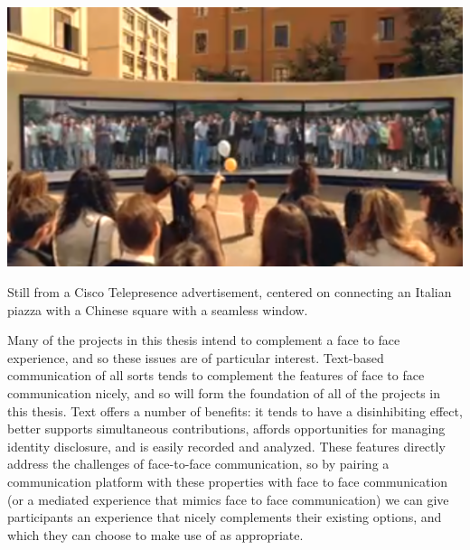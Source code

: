 \begin{marginfigure}
	\includegraphics{figures/cisco-telepresence.png}
	\caption{Still from a Cisco Telepresence advertisement, centered on connecting an Italian piazza with a Chinese square with a seamless window.}
	\label{fig:cisco-telepresence}
\end{marginfigure}


Many of the projects in this thesis intend to complement a face to face experience, and so these issues are of particular interest. Text-based communication of all sorts tends to complement the features of face to face communication nicely, and so will form the foundation of all of the projects in this thesis. Text offers a number of benefits: it tends to have a disinhibiting effect, better supports simultaneous contributions, affords opportunities for managing identity disclosure, and is easily recorded and analyzed. These features directly address the challenges of face-to-face communication, so by pairing a communication platform with these properties with face to face communication (or a mediated experience that mimics face to face communication) we can give participants an experience that nicely complements their existing options, and which they can choose to make use of as appropriate.






